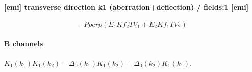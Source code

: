 \paragraph{[emi] transverse direction k1 (aberration+deflection) / fields:1 [emi]}
\begin{dmath*}
- Pperp \left(E_{1} Kf_{2} TV_{1} + E_{2} Kf_{1} TV_{2}\right)
\end{dmath*}
\paragraph{B channels} $K_1(k_1)K_1(k_2) - \Delta_0(k_1)K_1(k_2) - \Delta_0(k_2)K_1(k_1)$.
